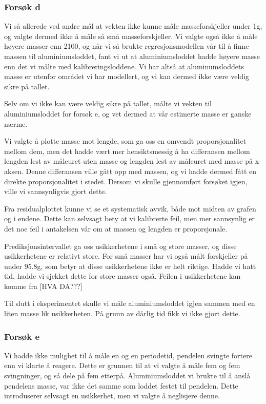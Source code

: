 \subsubsection*{Forsøk d}

Vi så allerede ved andre mål at vekten ikke kunne måle masseforskjeller under 1g, og valgte dermed ikke å måle så små masseforskjeller. Vi valgte også ikke å måle høyere masser enn 2100, og når vi så brukte regresjonsmodellen vår til å finne massen til aluminiumsloddet, fant vi ut at aluminiumsloddet hadde høyere masse enn det vi målte med kalibreringsloddene. Vi har altså at aluminumsloddets masse er utenfor området vi har modellert, og vi kan dermed ikke være veldig sikre på tallet. \smallskip

Selv om vi ikke kan være veldig sikre på tallet, målte vi vekten til aluminiumsloddet for forsøk e, og vet dermed at vår estimerte masse er ganske nærme.\smallskip

Vi valgte å plotte masse mot lengde, som ga oss en omvendt proporsjonalitet mellom dem, men det hadde vært mer hensiktsmessig å ha differansen mellom lengden lest av måleuret uten masse og lengden lest av måleuret med masse på x-aksen. Denne differansen ville gått opp med massen, og vi hadde dermed fått en direkte proporsjonalitet i stedet. Dersom vi skulle gjennomført forsøket igjen, ville vi sannsynligvis gjort dette.\smallskip

Fra residualplottet kunne vi se et systematisk avvik, både mot midten av grafen og i endene. Dette kan selvsagt bety at vi kalibrerte feil, men mer sannsynlig er det noe feil i antakelsen vår om at massen og lengden er proporsjonale. \smallskip

Prediksjonsintervallet ga oss usikkerhetene i små og store masser, og disse usikkerhetene er relativt store. For små masser har vi også målt forskjeller på under 95.8g, som betyr at disse usikkerhetene ikke er helt riktige. Hadde vi hatt tid, hadde vi sjekket dette for store masser også. Feilen i usikkerhetene kan komme fra [HVA DA???] \smallskip

Til slutt i eksperimentet skulle vi måle aluminiumsloddet igjen sammen med en liten masse lik usikkerheten. På grunn av dårlig tid fikk vi ikke gjort dette.

\subsubsection*{Forsøk e}

Vi hadde ikke mulighet til å måle en og en periodetid, pendelen svingte fortere enn vi klarte å reagere. Dette er grunnen til at vi valgte å måle fem og fem svingninger, og så dele på fem etterpå. 
Aluminiumsloddet vi brukte til å anslå pendelens masse, var ikke det samme som loddet festet til pendelen. Dette introduserer selvsagt en usikkerhet, men vi valgte å neglisjere denne. \smallskip

